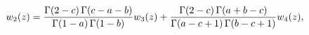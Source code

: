 \[w_{2}(z)=\frac{\mathop{\Gamma\/}\nolimits\!\left(2-c\right)\mathop{\Gamma\/}%
\nolimits\!\left(c-a-b\right)}{\mathop{\Gamma\/}\nolimits\!\left(1-a\right)%
\mathop{\Gamma\/}\nolimits\!\left(1-b\right)}w_{3}(z)+\frac{\mathop{\Gamma\/}%
\nolimits\!\left(2-c\right)\mathop{\Gamma\/}\nolimits\!\left(a+b-c\right)}{%
\mathop{\Gamma\/}\nolimits\!\left(a-c+1\right)\mathop{\Gamma\/}\nolimits\!%
\left(b-c+1\right)}w_{4}(z),\]
